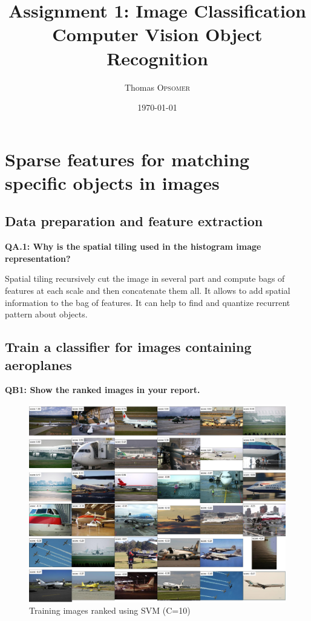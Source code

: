 \documentclass[a4paper,11pt]{exam}
\title{Assignment 1: Image Classification \\ Computer Vision Object Recognition} %
\author{Thomas \textsc{Opsomer}} %
\date{\today} %
\begin{document}
\maketitle %




\section{Sparse features for matching specific objects in images}

\subsection{Data preparation and feature extraction}

\textbf{QA.1: Why is the spatial tiling used in the histogram image representation?\\}

Spatial tiling recursively cut the image in several part and compute bags of features at each scale and then concatenate them all. It allows to add spatial information to the bag of features. It can help to find and quantize recurrent pattern about objects.

\subsection{Train a classifier for images containing aeroplanes}

\textbf{QB1: Show the ranked images in your report.\\}

\begin{figure}[!h]
\centering
\includegraphics[width=13cm]{figures/airplane_train_img_rank.jpg}
\caption{Training images ranked using SVM (C=10)}    
\label{airplane_train_img_rank}
\end{figure}
\end{document}
